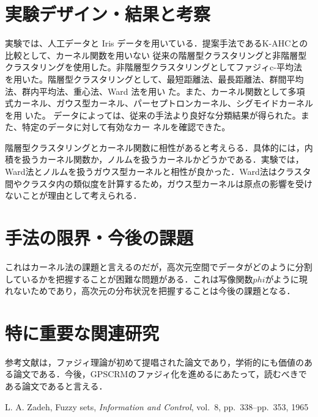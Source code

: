 \documentclass[10pt,onecolumn]{jsarticle}
\begin{document}
\section{実験デザイン・結果と考察}
実験では、人工データと Iris データを用いている．提案手法であるK-AHCとの比較として、カーネル関数を用いない
従来の階層型クラスタリングと非階層型クラスタリングを使用した。非階層型クラスタリングとしてファジィc-平均法
を用いた。階層型クラスタリングとして、最短距離法、最長距離法、群間平均法、群内平均法、重心法、Ward 法を用い
た。また、カーネル関数として多項式カーネル、ガウス型カーネル、パーセプトロンカーネル、シグモイドカーネルを用
いた。
データによっては、従来の手法より良好な分類結果が得られた。また、特定のデータに対して有効なカー
ネルを確認できた。

階層型クラスタリングとカーネル関数に相性があると考えらる．具体的には，内積を扱うカーネル関数か，ノルムを扱うカーネルかどうかである．実験では，Ward法とノルムを扱うガウス型カーネルと相性が良かった．Ward法はクラスタ間やクラスタ内の類似度を計算するため，ガウス型カーネルは原点の影響を受けないことが理由として考えられる．
\section{手法の限界・今後の課題}
これはカーネル法の課題と言えるのだが，高次元空間でデータがどのように分割しているかを把握することが困難な問題がある．これは写像関数$phi$がように現れないためであり，高次元の分布状況を把握することは今後の課題となる．
\section{特に重要な関連研究}

参考文献\cite{ref1}は，ファジィ理論が初めて提唱された論文であり，学術的にも価値のある論文である．今後，GPSCRMのファジィ化を進めるにあたって，読むべきである論文であると言える．

\begin{thebibliography}{99}
%
	L. A. Zadeh, Fuzzy sets, \textit{Information and Control}, vol.~8, pp.~338--pp.~353, 1965
%
\end{thebibliography}



\end{document}
